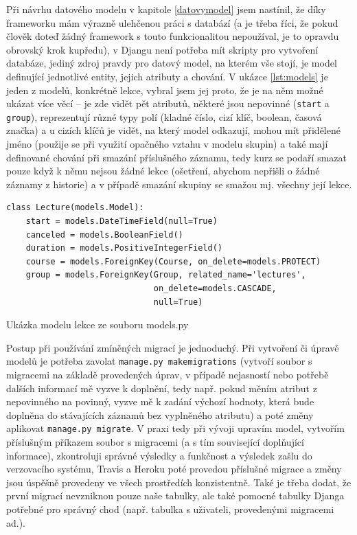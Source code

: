     Při návrhu datového modelu v kapitole \ref{datovymodel} jsem nastínil, že díky frameworku mám výrazně ulehčenou práci s databází (a je třeba říci, že pokud člověk doteď žádný framework s touto funkcionalitou nepoužíval, je to opravdu obrovský krok kupředu), v Djangu není potřeba mít skripty pro vytvoření databáze, jediný zdroj pravdy pro datový model, na kterém vše stojí, je model definující jednotlivé entity, jejich atributy a chování. V ukázce \ref{lst:models} je jeden z modelů, konkrétně lekce, vybral jsem jej proto, že je na něm možné ukázat více věcí -- je zde vidět pět atributů, některé jsou nepovinné (\verb|start| a \verb|group|), reprezentují různé typy polí (kladné číslo, cizí klíč, boolean, časová značka) a u cizích klíčů je vidět, na který model odkazují, mohou mít přidělené jméno (použije se při využití opačného vztahu v modelu skupin) a také mají definované chování při smazání příslušného záznamu, tedy kurz se podaří smazat pouze když k němu nejsou žádné lekce (ošetření, abychom nepřišli o žádné záznamy z historie) a v případě smazání skupiny se smažou mj. všechny její lekce.
    
    \begin{listing}[ht]
    	\begin{verbatim}
class Lecture(models.Model):
    start = models.DateTimeField(null=True)
    canceled = models.BooleanField()
    duration = models.PositiveIntegerField()
    course = models.ForeignKey(Course, on_delete=models.PROTECT)
    group = models.ForeignKey(Group, related_name='lectures',
                              on_delete=models.CASCADE,
                              null=True)
    	\end{verbatim}
    	\caption{Ukázka modelu lekce ze souboru models.py}\label{lst:models}
    \end{listing}
    
    Postup při používání zmíněných migrací je jednoduchý. Při vytvoření či úpravě modelů je potřeba zavolat \verb|manage.py makemigrations| (vytvoří soubor s migracemi na základě provedených úprav, v případě nejasností nebo potřebě dalších informací mě vyzve k doplnění, tedy např. pokud měním atribut z nepovinného na povinný, vyzve mě k zadání výchozí hodnoty, která bude doplněna do stávajících záznamů bez vyplněného atributu) a poté změny aplikovat \verb|manage.py migrate|. V praxi tedy při vývoji upravím model, vytvořím příslušným příkazem soubor s migracemi (a s tím související doplňující informace), zkontroluji správné výsledky a funkčnost a výsledek zašlu do verzovacího systému, Travis a Heroku poté provedou příslušné migrace a změny jsou úspěšně provedeny ve všech prostředích konzistentně. Také je třeba dodat, že první migrací nevzniknou pouze naše tabulky, ale také pomocné tabulky Djanga potřebné pro správný chod (např. tabulka s uživateli, provedenými migracemi ad.).
    
